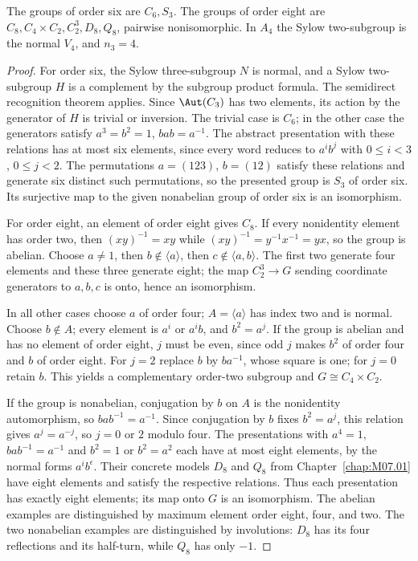 \begin{proposition}\label{prop:small-group-orders}
The groups of order six are $C_6,S_3$. The groups of order eight are
$C_8,C_4\times C_2,C_2^3,D_8,Q_8$, pairwise nonisomorphic. In $A_4$ the Sylow two-subgroup is the normal $V_4$, and $n_3=4$.
\end{proposition}
\begin{proof}
For order six, the Sylow three-subgroup $N$ is normal, and a Sylow two-subgroup $H$ is a complement by the subgroup product formula. The semidirect recognition theorem applies. Since $\Aut(C_3)$ has two elements, its action by the generator of $H$ is trivial or inversion. The trivial case is $C_6$; in the other case the generators satisfy $a^3=b^2=1$, $bab=a^{-1}$. The abstract presentation with these relations has at most six elements, since every word reduces to $a^ib^j$ with $0\leq i<3$, $0\leq j<2$. The permutations $a=(123)$, $b=(12)$ satisfy these relations and generate six distinct such permutations, so the presented group is $S_3$ of order six. Its surjective map to the given nonabelian group of order six is an isomorphism.

For order eight, an element of order eight gives $C_8$. If every nonidentity element has order two, then $(xy)^{-1}=xy$ while $(xy)^{-1}=y^{-1}x^{-1}=yx$, so the group is abelian. Choose $a\ne1$, then $b\notin\langle a\rangle$, then $c\notin\langle a,b\rangle$. The first two generate four elements and these three generate eight; the map $C_2^3\to G$ sending coordinate generators to $a,b,c$ is onto, hence an isomorphism.

In all other cases choose $a$ of order four; $A=\langle a\rangle$ has index two and is normal. Choose $b\notin A$; every element is $a^i$ or $a^ib$, and $b^2=a^j$. If the group is abelian and has no element of order eight, $j$ must be even, since odd $j$ makes $b^2$ of order four and $b$ of order eight. For $j=2$ replace $b$ by $ba^{-1}$, whose square is one; for $j=0$ retain $b$. This yields a complementary order-two subgroup and $G\cong C_4\times C_2$.

If the group is nonabelian, conjugation by $b$ on $A$ is the nonidentity automorphism, so $bab^{-1}=a^{-1}$. Since conjugation by $b$ fixes $b^2=a^j$, this relation gives $a^j=a^{-j}$, so $j=0$ or $2$ modulo four. The presentations with $a^4=1$, $bab^{-1}=a^{-1}$ and $b^2=1$ or $b^2=a^2$ each have at most eight elements, by the normal forms $a^ib^\epsilon$. Their concrete models $D_8$ and $Q_8$ from Chapter~\ref{chap:M07.01} have eight elements and satisfy the respective relations. Thus each presentation has exactly eight elements; its map onto $G$ is an isomorphism. The abelian examples are distinguished by maximum element order eight, four, and two. The two nonabelian examples are distinguished by involutions: $D_8$ has its four reflections and its half-turn, while $Q_8$ has only $-1$.


\end{proof}
